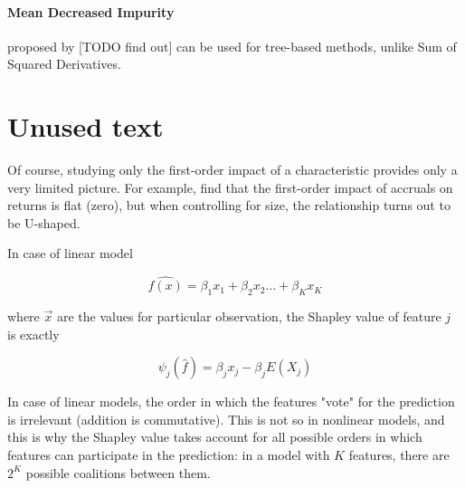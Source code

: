 			\paragraph{Mean Decreased Impurity} proposed by [TODO find out] can be used for tree-based methods, unlike Sum of Squared Derivatives.   
		 

	\section{Unused text}
		
	   		Of course, studying only the first-order impact of a characteristic provides only a very limited picture. For example, \cite{bryzgalova2019forest} find that the first-order impact of accruals on returns is flat (zero), but when controlling for size, the relationship turns out to be U-shaped. 
	   		
	   		
	   		
	   		In case of linear model
	   		
	   		\begin{equation}
	   		\hat{f(x)} = \beta_1x_1 + \beta_2x_2 \ldots + \beta_K x_K
	   		\end{equation}
	   		
	   		where $\vec{x}$ are the values for particular observation, the Shapley value of feature $j$ is exactly
	   		
	   		\begin{equation}
	   		\psi_j(\hat{f}) = \beta_jx_j - \beta_jE(X_j)
	   		\end{equation}
	   		
	   		 In case of linear models, the order in which the features "vote" for the prediction is irrelevant (addition is commutative). This is not so in nonlinear models, and this is why the Shapley value takes account for all possible orders in which features can participate in the prediction: in a model with $K$ features, there are $2^K$ possible coalitions between them.
	



